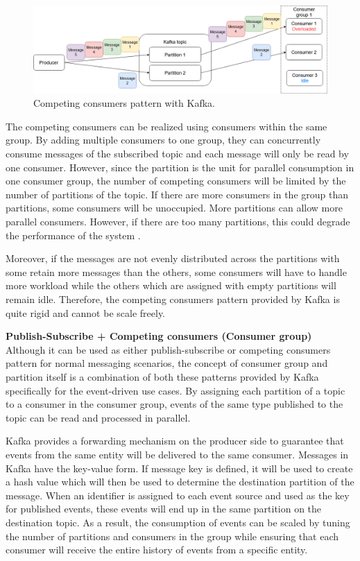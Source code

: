 \begin{figure}[h]
	\centering
	\includegraphics[width=\linewidth]{images/competing-consumers-kafka.png}
	\caption{Competing consumers pattern with Kafka.}
	\label{fig:kafkacompetingconsumer}
\end{figure}
The competing consumers can be realized using consumers within the same group. By adding multiple consumers to one group, they can concurrently consume messages of the subscribed topic and each message will only be read by one consumer. However, since the partition is the unit for parallel consumption in one consumer group, the number of competing consumers will be limited by the number of partitions of the topic. If there are more consumers in the group than partitions, some consumers will be unoccupied. More partitions can allow more parallel consumers. However, if there are too many partitions, this could degrade the performance of the system \cite{kafkapartitionsnum}.

Moreover, if the messages are not evenly distributed across the partitions with some retain more messages than the others, some consumers will have to handle more workload while the others which are assigned with empty partitions will remain idle. Therefore, the competing consumers pattern provided by Kafka is quite rigid and cannot be scale freely.

\textbf{Publish-Subscribe + Competing consumers (Consumer group)}\\
Although it can be used as either publish-subscribe or competing consumers pattern for normal messaging scenarios, the concept of consumer group and partition itself is a combination of both these patterns provided by Kafka specifically for the event-driven use cases. By assigning each partition of a topic to a consumer in the consumer group, events of the same type published to the topic can be read and processed in parallel. 

Kafka provides a forwarding mechanism on the producer side to guarantee that events from the same entity will be delivered to the same consumer. Messages in Kafka have the key-value form. If message key is defined, it will be used to create a hash value which will then be used to determine the destination partition of the message. When an identifier is assigned to each event source and used as the key for published events, these events will end up in the same partition on the destination topic. As a result, the consumption of events can be scaled by tuning the number of partitions and consumers in the group while ensuring that each consumer will receive the entire history of events from a specific entity.  

